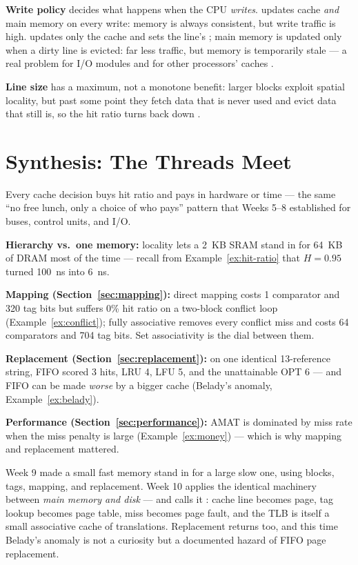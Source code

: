\documentclass[11pt]{article}
\begin{document}
\textbf{Write policy} decides what happens when the CPU \emph{writes}.  updates cache \emph{and} main memory on every write: memory is always consistent, but write traffic is high.  updates only the cache and sets the line's ; main memory is updated only when a dirty line is evicted: far less traffic, but memory is temporarily stale --- a real problem for I/O modules and for other processors' caches \cite[\S5.2 Write Policy, PDF pp.~203--205]{Stallings2015_computer_organization}.

\textbf{Line size} has a maximum, not a monotone benefit: larger blocks exploit spatial locality, but past some point they fetch data that is never used and evict data that still is, so the hit ratio turns back down \cite[\S5.2 Line Size, PDF p.~205]{Stallings2015_computer_organization}.

\section{Synthesis: The Threads Meet}
\label{sec:synthesis}

Every cache decision buys hit ratio and pays in hardware or time --- the same ``no free lunch, only a choice of who pays'' pattern that Weeks 5--8 established for buses, control units, and I/O.

\textbf{Hierarchy vs.\ one memory:} locality lets a 2~KB SRAM stand in for 64~KB of DRAM most of the time --- recall from Example~\ref{ex:hit-ratio} that $H=0.95$ turned 100~ns into 6~ns.

\textbf{Mapping (Section~\ref{sec:mapping}):} direct mapping costs 1 comparator and 320 tag bits but suffers 0\% hit ratio on a two-block conflict loop (Example~\ref{ex:conflict}); fully associative removes every conflict miss and costs 64 comparators and 704 tag bits. Set associativity is the dial between them.

\textbf{Replacement (Section~\ref{sec:replacement}):} on one identical 13-reference string, FIFO scored 3 hits, LRU 4, LFU 5, and the unattainable OPT 6 --- and FIFO can be made \emph{worse} by a bigger cache (Belady's anomaly, Example~\ref{ex:belady}).

\textbf{Performance (Section~\ref{sec:performance}):} AMAT is dominated by miss rate when the miss penalty is large (Example~\ref{ex:money}) --- which is why mapping and replacement mattered.

Week 9 made a small fast memory stand in for a large slow one, using blocks, tags, mapping, and replacement. Week 10 applies the identical machinery between \emph{main memory and disk} --- and calls it : cache line becomes page, tag lookup becomes page table, miss becomes page fault, and the TLB is itself a small associative cache of translations. Replacement returns too, and this time Belady's anomaly is not a curiosity but a documented hazard of FIFO page replacement.
\end{document}
